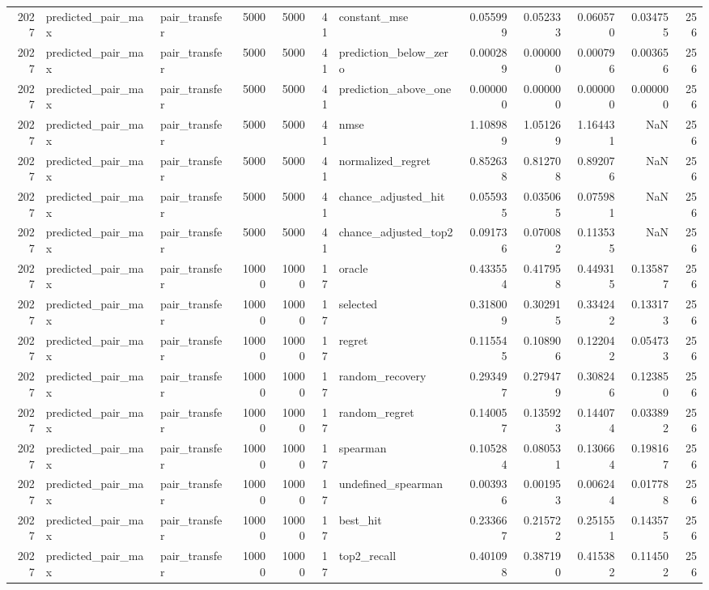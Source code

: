 \begin{tabular}{rllrrrlrrrrr}
2027 & predicted_pair_max & pair_transfer & 5000 & 5000 & 41 & constant_mse & 0.055999 & 0.052333 & 0.060570 & 0.034755 & 256 \\
2027 & predicted_pair_max & pair_transfer & 5000 & 5000 & 41 & prediction_below_zero & 0.000289 & 0.000000 & 0.000796 & 0.003656 & 256 \\
2027 & predicted_pair_max & pair_transfer & 5000 & 5000 & 41 & prediction_above_one & 0.000000 & 0.000000 & 0.000000 & 0.000000 & 256 \\
2027 & predicted_pair_max & pair_transfer & 5000 & 5000 & 41 & nmse & 1.108989 & 1.051269 & 1.164431 & NaN & 256 \\
2027 & predicted_pair_max & pair_transfer & 5000 & 5000 & 41 & normalized_regret & 0.852638 & 0.812708 & 0.892076 & NaN & 256 \\
2027 & predicted_pair_max & pair_transfer & 5000 & 5000 & 41 & chance_adjusted_hit & 0.055935 & 0.035065 & 0.075981 & NaN & 256 \\
2027 & predicted_pair_max & pair_transfer & 5000 & 5000 & 41 & chance_adjusted_top2 & 0.091736 & 0.070082 & 0.113535 & NaN & 256 \\
2027 & predicted_pair_max & pair_transfer & 10000 & 10000 & 17 & oracle & 0.433554 & 0.417958 & 0.449315 & 0.135877 & 256 \\
2027 & predicted_pair_max & pair_transfer & 10000 & 10000 & 17 & selected & 0.318009 & 0.302915 & 0.334242 & 0.133173 & 256 \\
2027 & predicted_pair_max & pair_transfer & 10000 & 10000 & 17 & regret & 0.115545 & 0.108906 & 0.122042 & 0.054733 & 256 \\
2027 & predicted_pair_max & pair_transfer & 10000 & 10000 & 17 & random_recovery & 0.293497 & 0.279479 & 0.308246 & 0.123850 & 256 \\
2027 & predicted_pair_max & pair_transfer & 10000 & 10000 & 17 & random_regret & 0.140057 & 0.135923 & 0.144074 & 0.033892 & 256 \\
2027 & predicted_pair_max & pair_transfer & 10000 & 10000 & 17 & spearman & 0.105284 & 0.080531 & 0.130664 & 0.198167 & 256 \\
2027 & predicted_pair_max & pair_transfer & 10000 & 10000 & 17 & undefined_spearman & 0.003936 & 0.001953 & 0.006244 & 0.017788 & 256 \\
2027 & predicted_pair_max & pair_transfer & 10000 & 10000 & 17 & best_hit & 0.233667 & 0.215722 & 0.251551 & 0.143575 & 256 \\
2027 & predicted_pair_max & pair_transfer & 10000 & 10000 & 17 & top2_recall & 0.401098 & 0.387190 & 0.415382 & 0.114502 & 256 \\

\end{tabular}

